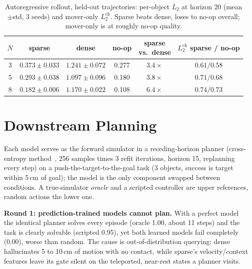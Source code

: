 \documentclass[conference]{IEEEtran}
\begin{document}
\begin{table}[t]
\caption{Autoregressive rollout, held-out trajectories: per-object $L_2$ at horizon 20
(mean$\pm$std, 3 seeds) and mover-only $L_2^{\text{ch}}$. Sparse beats dense, loses to
no-op overall; mover-only is at roughly no-op quality.}
\label{tab:rollout}
\centering \footnotesize \setlength{\tabcolsep}{3pt}
\begin{tabular}{@{}cccccc@{}}
\toprule
$N$ & sparse & dense & no-op & \shortstack{sparse\\vs.\ dense} &
\shortstack{$L_2^{\text{ch}}$\\sparse / no-op} \\
\midrule
3 & $0.373 \pm 0.033$ & $1.241 \pm 0.072$ & 0.277 & $3.4\times$ & $0.61 / 0.58$ \\
5 & $0.293 \pm 0.038$ & $1.097 \pm 0.096$ & 0.180 & $3.8\times$ & $0.71 / 0.68$ \\
8 & $0.182 \pm 0.006$ & $1.170 \pm 0.022$ & 0.108 & $6.4\times$ & $0.74 / 0.73$ \\
\bottomrule
\end{tabular}
\end{table}

\section{Downstream Planning}\label{sec:planning}
Each model serves as the forward simulator in a receding-horizon planner (cross-entropy
method~\cite{rubinstein1999cem}, 256 samples times 3 refit iterations, horizon 15,
replanning every step) on a push-the-target-to-the-goal task (3 objects, success is target
within 5\,cm of goal); the model is the only component swapped between conditions. A
true-simulator \emph{oracle} and a scripted controller are upper references, random
actions the lower one.

\textbf{Round 1: prediction-trained models cannot plan.} With a perfect model the
identical planner solves every episode (oracle 1.00, about 11 steps) and the task is
clearly solvable (scripted 0.95), yet both learned models fail completely (0.00),
worse than random. The cause is out-of-distribution querying: dense hallucinates 5 to
10\,cm of motion with no contact, while sparse's velocity/context features leave its gate
silent on the teleported, near-rest states a planner visits.
\end{document}
